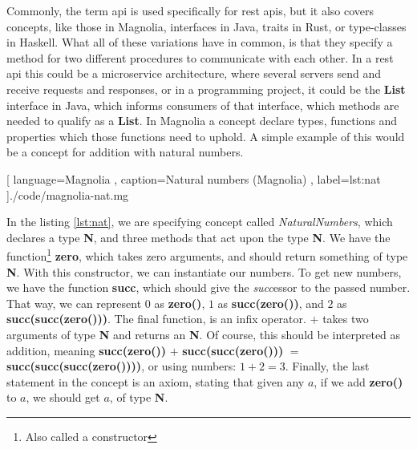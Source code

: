 Commonly, the term \gls*{api} is used specifically for \gls*{rest} \gls*{api}s, but
it also covers concepts, like those in Magnolia, interfaces in Java, traits in
Rust, or type-classes in Haskell. What all of these variations have in common,
is that they specify a method for two different procedures to communicate with
each other. In a \gls*{rest} \gls*{api} this could be a microservice architecture,
where several servers send and receive requests and responses, or in a
programming project, it could be the \textbf{List} interface in Java, which
informs consumers of that interface, which methods are needed to qualify as a
\textbf{List}. In Magnolia a concept declare types, functions and properties
which those functions need to uphold. A simple example of this would be a
concept for addition with natural numbers.

\begin{center}
  
    [ language=Magnolia
    , caption={Natural numbers (Magnolia)}
    , label=lst:nat
    ]{./code/magnolia-nat.mg}
\end{center}

In the listing \ref{lst:nat}, we are specifying concept called
\textit{NaturalNumbers}, which declares a type \textbf{N}, and three methods
that act upon the type \textbf{N}. We have the function\footnote{Also called a constructor}
\textbf{zero}, which takes zero arguments, and should return something of type
\textbf{N}. With this constructor, we can instantiate our numbers. To get new
numbers, we have the function \textbf{succ}, which should give the
\textit{succ}essor to the passed number. That way, we can represent $0$ as
\textbf{zero()}, $1$ as \textbf{succ(zero())}, and $2$ as
\textbf{succ(succ(zero()))}. The final function, is an infix operator. $+$ takes
two arguments of type \textbf{N} and returns an \textbf{N}. Of course, this
should be interpreted as addition, meaning \textbf{succ(zero())} $+$
\textbf{succ(succ(zero()))} $=$ \textbf{succ(succ(succ(zero())))}, or using
numbers: $1 + 2 = 3$. Finally, the last statement in the concept is an axiom,
stating that given any $a$, if we add \textbf{zero()} to $a$, we should get $a$,
of type \textbf{N}.


